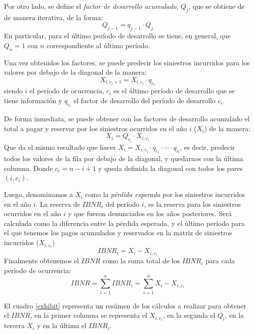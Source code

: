 \documentclass[
  12pt,
]{article}
\begin{document}
Por otro lado, se define el \emph{factor de desarrollo acumulado},
\(Q_{j}\), que se obtiene de de manera iterativa, de la forma: \[
Q_{j-1} = q_{j-1}\cdot Q_{j}
\] En particular, para el último período de desarrollo se tiene, en
general, que \(Q_n = 1\) con \(n\) correspondiente al último período.

Una vez obtenidos los factores, se puede predecir los siniestros
incurridos para los valores por debajo de la diagonal de la manera: \[
X_{i,c_i +1} = X_{i,c_i} \cdot q_{c_i}
\] siendo \(i\) el período de ocurrencia, \(c_i\) es el último período
de desarrollo que se tiene información y \(q_{c_i}\) el factor de
desarrollo del período de desarrollo \(c_i\).

De forma inmediata, se puede obtener con los factores de desarrollo
acumulado el total a pagar y reservar por los siniestros ocurridos en el
año \(i\) (\(X_i\)) de la manera: \[
X_i = Q_{c_i} \cdot X_{i,c_i}
\] Que da el mismo resultado que hacer
\(X_i = X_{i,c_i} \cdot q_{c_i} \cdot \cdots \cdot q_{n}\), es decir,
predecir todos los valores de la fila por debajo de la diagonal, y
quedarnos con la última columna. Donde \(c_i = n-i+1\) y queda definida
la diagonal con todos los pares \((i,c_i)\).

Luego, denominamos a \(X_i\) como la \emph{pérdida esperada} por los
siniestros incurridos en el año \(i\). La reserva de \(IBNR_i\) del
período \(i\), es la reserva para los siniestros ocurridos en el año
\(i\) y que fueron denunciados en los años posteriores. Será calculada
como la diferencia entre la pérdida esperada, y el último período para
el que tenemos los pagos acumulados y reservados en la matriz de
siniestros incurridos (\(X_{i,c_i}\)) \[
IBNR_i = X_i - X_{i,c_i} 
\] Finalmente obtenemos el \(IBNR\) como la suma total de los \(IBNR_i\)
para cada período de ocurrencia: \[
IBNR = \sum_{i=1}^n IBNR_i = \sum_{i=1}^n X_i - X_{i,c_i} 
\]

El cuadro \ref{exhibit} representa un resúmen de los cálculos a realizar
para obtener el \(IBNR\), en la primer columna se representa el
\(X_{i,c_i}\), en la segunda el \(Q_i\), en la tercera \(X_i\) y en la
última el \(IBNR_i\).
\end{document}
